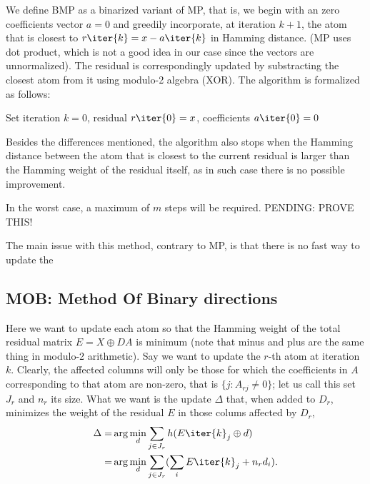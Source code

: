 \documentclass[a4paper]{IEEEtran}
\begin{document}
We define BMP as a binarized variant of MP, that is, we begin with an zero coefficients vector $a=0$ and greedily incorporate, at iteration $k+1$, the atom that is closest to  $r\iter{k} = x - a\iter{k}$ in Hamming distance. (MP uses dot product, which is not a good idea in our case since the vectors are unnormalized). %
The residual is correspondingly  updated by substracting the closest atom from it using modulo-2 algebra (XOR). The algorithm is formalized as follows:

\begin{algorithm}[ht]
Set iteration $k=0$, residual $r\iter{0}=x$, coefficients $a\iter{0}=0$\;
\label{alg:bmp}
\end{algorithm}

Besides the differences mentioned, the algorithm also stops when the Hamming distance between the atom that is closest to the current residual is larger than the Hamming weight of the residual itself, as in such case there is no possible improvement. %

In the worst case, a maximum of $m$ steps will be required.
PENDING: PROVE THIS!

The main issue with this method, contrary to MP, is that there is no fast way to update the  
\subsection{MOB: Method Of Binary directions}
 
Here we want to update each atom so that the Hamming weight of the total residual matrix $E = X \oplus DA$ is minimum (note that minus and plus are the same thing in modulo-2 arithmetic). Say we want to update the $r$-th atom at iteration $k$. Clearly, the affected columns will only be those for which the  coefficients in $A$  corresponding to that atom are non-zero, that is $\{j : A_{rj} \neq 0 \}$; let us call this set $J_r$ and $n_r$ its size. What we want is the update $\Delta$ that, when added to $D_r$, minimizes the weight of the residual $E$ in those colums affected by $D_r$,
 \begin{eqnarray}
 \Delta  =& \arg\min_d \sum_{j \in J_r}  h(E\iter{k}_j \oplus d) \\
 =& \arg\min_d \sum_{j \in J_r} (\sum_i E\iter{k}_j + n_r d_i).
\label{eq:mob1}
 \end{eqnarray}
\end{document}
